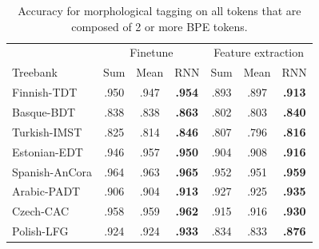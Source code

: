 \documentclass[11pt]{article}
\begin{document}
	\begin{table}[h]
	\centering
	\begin{tabular}{l|ccc|ccc}
		 & \multicolumn{3}{c}{Finetune} & \multicolumn{3}{c}{Feature extraction} \\
		Treebank & Sum & Mean & RNN & Sum & Mean & RNN  \\
		 \hline
		Finnish-TDT     & .950 & .947 & \textbf{.954} & .893 & .897 & \textbf{.913} \\ 
		Basque-BDT      & .838 & .838 & \textbf{.863} & .802 & .803 & \textbf{.840} \\
		Turkish-IMST    & .825 & .814 & \textbf{.846} & .807 & .796 & \textbf{.816} \\
		Estonian-EDT    & .946 & .957 & \textbf{.950} & .904 & .908 & \textbf{.916} \\
		Spanish-AnCora  & .964 & .963 & \textbf{.965} & .952 & .951 & \textbf{.959} \\
		Arabic-PADT     & .906 & .904 & \textbf{.913} & .927 & .925 & \textbf{.935}\\
		Czech-CAC       & .958 & .959 & \textbf{.962} & .915 & .916 & \textbf{.930} \\
		Polish-LFG      & .924 & .924 & \textbf{.933} & .834 & .833 & \textbf{.876} \\
	\end{tabular}
	\caption{\label{tab:results_large_tokens} Accuracy for morphological tagging on all tokens that are composed of 2 or more BPE tokens.}
\end{table}
\end{document}
